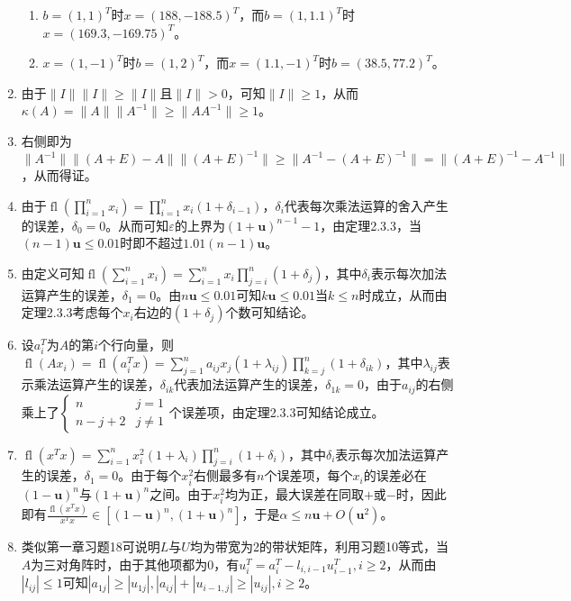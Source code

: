 \documentclass[a4paper,UTF8,fontset=windows]{ctexart}
\DeclareMathOperator{\fl}{fl}
\begin{document}
\begin{enumerate}
\begin{enumerate}[(1)]
\item
$b=(1,1)^T$时$x=(188,-188.5)^T$，而$b=(1,1.1)^T$时$x=(169.3,-169.75)^T$。

\item
$x=(1,-1)^T$时$b=(1,2)^T$，而$x=(1.1,-1)^T$时$b=(38.5,77.2)^T$。
\end{enumerate}

\item
由于$\|I\|\|I\|\ge\|I\|$且$\|I\|>0$，可知$\|I\|\ge1$，从而$\kappa(A)=\|A\|\|A^{-1}\|\ge\|AA^{-1}\|\ge1$。

\item
右侧即为$\|A^{-1}\|\|(A+E)-A\|\|(A+E)^{-1}\|\ge\|A^{-1}-(A+E)^{-1}\|=\|(A+E)^{-1}-A^{-1}\|$，从而得证。

\item
由于$\fl(\prod_{i=1}^nx_i)=\prod_{i=1}^nx_i(1+\delta_{i-1})$，$\delta_i$代表每次乘法运算的舍入产生的误差，$\delta_0=0$。从而可知$\varepsilon$的上界为$(1+\mathbf{u})^{n-1}-1$，由定理2.3.3，当$(n-1)\mathbf{u}\le0.01$时即不超过$1.01(n-1)\mathbf{u}$。

\item
由定义可知$\fl(\sum_{i=1}^nx_i)=\sum_{i=1}^nx_i\prod_{j=i}^{n}(1+\delta_j)$，其中$\delta_i$表示每次加法运算产生的误差，$\delta_1=0$。由$n\mathbf{u}\le0.01$可知$k\mathbf{u}\le0.01$当$k\le n$时成立，从而由定理2.3.3考虑每个$x_i$右边的$(1+\delta_j)$个数可知结论。

\item
设$a_i^T$为$A$的第$i$个行向量，则$\fl(Ax_i)=\fl(a_i^Tx)=\sum_{j=1}^na_{ij}x_j(1+\lambda_{ij})\prod_{k=j}^n(1+\delta_{ik})$，其中$\lambda_{ij}$表示乘法运算产生的误差，$\delta_{ik}$代表加法运算产生的误差，$\delta_{1k}=0$，由于$a_{ij}$的右侧乘上了$\begin{cases}n&j=1\\n-j+2&j\ne1\end{cases}$个误差项，由定理2.3.3可知结论成立。

\item
$\fl(x^Tx)=\sum_{i=1}^nx_i^2(1+\lambda_i)\prod_{j=i}^n(1+\delta_i)$，其中$\delta_i$表示每次加法运算产生的误差，$\delta_1=0$。由于每个$x_i^2$右侧最多有$n$个误差项，每个$x_i$的误差必在$(1-\mathbf{u})^n$与$(1+\mathbf{u})^n$之间。由于$x_i^2$均为正，最大误差在同取$+$或$-$时，因此即有$\frac{\fl(x^Tx)}{x^Tx}\in[(1-\mathbf{u})^n,(1+\mathbf{u})^n]$，于是$\alpha\le n\mathbf{u}+O(\mathbf{u}^2)$。

\item
类似第一章习题18可说明$L$与$U$均为带宽为2的带状矩阵，利用习题10等式，当$A$为三对角阵时，由于其他项都为0，有$u_i^T=a_i^T-l_{i,i-1}u_{i-1}^T,i\ge2$，从而由$|l_{ij}|\le1$可知$|a_{1j}|\ge|u_{1j}|, |a_{ij}|+|u_{i-1,j}|\ge|u_{ij}|,i\ge2$。


\end{enumerate}
\end{document}
